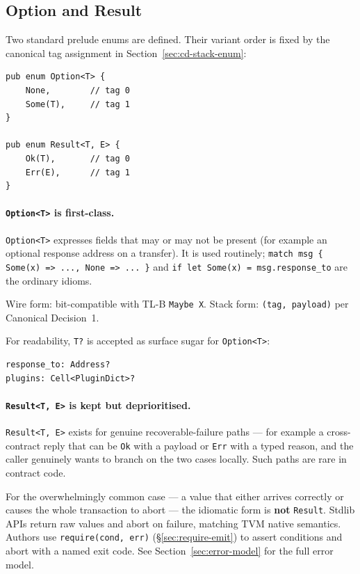 \documentclass[12pt,oneside]{article}
\begin{document}
\subsection{Option and Result}
Two standard prelude enums are defined. Their variant order is fixed by
the canonical tag assignment in Section~\ref{sec:cd-stack-enum}:

\begin{verbatim}
pub enum Option<T> {
    None,        // tag 0
    Some(T),     // tag 1
}

pub enum Result<T, E> {
    Ok(T),       // tag 0
    Err(E),      // tag 1
}
\end{verbatim}

\paragraph{\texttt{Option<T>} is first-class.}
\verb|Option<T>| expresses fields that may or may not be present (for
example an optional response address on a transfer). It is used
routinely; \verb|match msg { Some(x) => ..., None => ... }| and
\verb|if let Some(x) = msg.response_to| are the ordinary idioms.

Wire form: bit-compatible with TL-B \verb|Maybe X|. Stack form:
\verb|(tag, payload)| per Canonical Decision~1.

For readability, \verb|T?| is accepted as surface sugar for
\verb|Option<T>|:

\begin{verbatim}
response_to: Address?
plugins: Cell<PluginDict>?
\end{verbatim}

\paragraph{\texttt{Result<T, E>} is kept but deprioritised.}
\verb|Result<T, E>| exists for genuine recoverable-failure paths --- for
example a cross-contract reply that can be \verb|Ok| with a payload or
\verb|Err| with a typed reason, and the caller genuinely wants to branch
on the two cases locally. Such paths are rare in contract code.

For the overwhelmingly common case --- a value that either arrives
correctly or causes the whole transaction to abort --- the idiomatic
form is \textbf{not} \verb|Result|. Stdlib APIs return raw values and
abort on failure, matching TVM native semantics. Authors use
\verb|require(cond, err)| (\S\ref{sec:require-emit}) to assert
conditions and abort with a named exit code. See
Section~\ref{sec:error-model} for the full error model.
\end{document}
